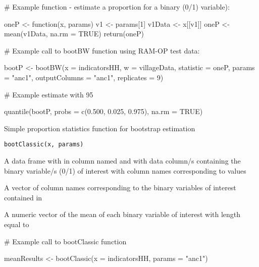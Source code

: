 \documentclass[a4paper]{book}
\begin{document}
%
\begin{Examples}
\begin{ExampleCode}
# Example function - estimate a proportion for a binary (0/1) variable):

oneP <- function(x, params) {
  v1 <- params[1]
  v1Data <- x[[v1]]
  oneP <- mean(v1Data, na.rm = TRUE)
  return(oneP)
}

# Example call to bootBW function using RAM-OP test data:

bootP <- bootBW(x = indicatorsHH,
                w = villageData,
                statistic = oneP,
                params = "anc1",
                outputColumns = "anc1",
                replicates = 9)

# Example estimate with 95%

quantile(bootP, probs = c(0.500, 0.025, 0.975), na.rm = TRUE)

\end{ExampleCode}
\end{Examples}
%
\begin{Description}\relax
Simple proportion statistics function for bootstrap estimation
\end{Description}
%
\begin{Usage}
\begin{verbatim}
bootClassic(x, params)
\end{verbatim}
\end{Usage}
%
\begin{Arguments}
\begin{ldescription}
\item[\code{x}] A data frame with  in column named
 and with data column/s containing the binary variable/s (0/1) of
interest with column names corresponding to  values

\item[\code{params}] A vector of column names corresponding to the binary variables
of interest contained in 
\end{ldescription}
\end{Arguments}
%
\begin{Value}
A numeric vector of the mean of each binary variable of interest with
length equal to 
\end{Value}
%
\begin{Examples}
\begin{ExampleCode}

# Example call to bootClassic function

meanResults <- bootClassic(x = indicatorsHH,
                           params = "anc1")

\end{ExampleCode}
\end{Examples}
\end{document}
